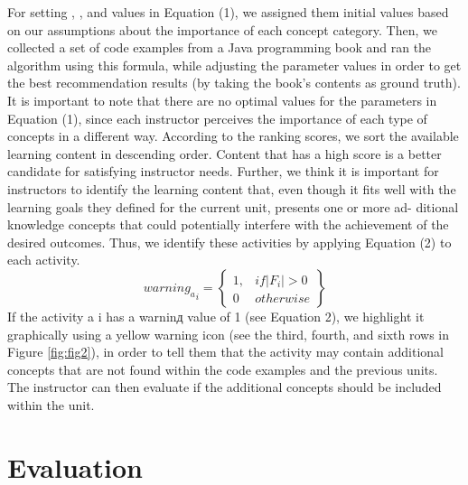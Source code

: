 \documentclass{sig-alternate}
\begin{document}
For setting \textalpha , \textbeta , and \textgamma values in Equation (1), we assigned them
initial values based on our assumptions about the importance of
each concept category. Then, we collected a set of code examples
from a Java programming book and ran the algorithm using this
formula, while adjusting the parameter values in order to get the
best recommendation results (by taking the book’s contents as
ground truth). It is important to note that there are no optimal
values for the parameters in Equation (1), since each instructor
perceives the importance of each type of concepts in a different
way.
According to the ranking scores, we sort the available learning
content in descending order. Content that has a high score is a
better candidate for satisfying instructor needs.
Further, we think it is important for instructors to identify the
learning content that, even though it fits well with the learning
goals they defined for the current unit, presents one or more ad-
ditional knowledge concepts that could potentially interfere with
the achievement of the desired outcomes. Thus, we identify these
activities by applying Equation (2) to each activity.
\begin{equation}
    {warning_a}_i =   \begin{Bmatrix}1,&if|F_i|>0\\0&otherwise\end{Bmatrix}
\end{equation}
If the activity a i has a warninд value of 1 (see Equation 2), we
highlight it graphically using a yellow warning icon (see the third,
fourth, and sixth rows in Figure \ref{fig:fig2}), in order to tell them that the
activity may contain additional concepts that are not found within the code examples and the previous units. The instructor can then
evaluate if the additional concepts should be included within the
unit.
\section{Evaluation}
\end{document}

